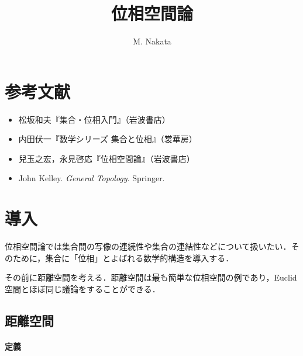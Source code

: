 \documentclass[pandoc,base=10pt,b5j,precisetext]{bxjsarticle}
\title{位相空間論}
\author{M. Nakata}
\date{}
\providecommand{\tightlist}{%
  \setlength{\itemsep}{0pt}\setlength{\parskip}{0pt}}
\let\oldparagraph\paragraph
\renewcommand{\paragraph}[1]{\oldparagraph{#1}\mbox{}}
\begin{document}
\maketitle

{
\setcounter{tocdepth}{3}
\tableofcontents
}
\newcommand{\deli}{\,:\,}
\newcommand{\bb}[1]{\boldsymbol{#1}}
\renewcommand{\i}{\mathrm{i}}
\renewcommand{\bar}[1]{\overline{#1}}
\renewcommand{\le}{\leqslant}
\renewcommand{\ge}{\geqslant}
\newcommand{\qset}[2]{{#1}/\!\,{#2}}
\newcommand{\scr}[1]{\mathscr{#1}}
\renewcommand{\cal}[1]{\mathcal{#1}}
\newcommand{\pfrac}[2]{\frac{\partial #1}{\partial #2}}
\newcommand{\card}{\mathop{\mathrm{card}}\nolimits}
\newcommand{\Span}{\mathop{\mathrm{span}}}
\newcommand{\obj}{\mathop{\mathrm{obj}}}
\newcommand{\Hom}{\mathop{\mathrm{Hom}}}

\hypertarget{ux53c2ux8003ux6587ux732e}{%
\section{参考文献}\label{ux53c2ux8003ux6587ux732e}}

\begin{itemize}
\tightlist
\item
  松坂和夫『集合・位相入門』（岩波書店）
\item
  内田伏一『数学シリーズ 集合と位相』（裳華房）
\item
  兒玉之宏，永見啓応『位相空間論』（岩波書店）
\item
  John Kelley. \emph{General Topology}. Springer.
\end{itemize}

\hypertarget{topology-introduction}{%
\section{導入}\label{topology-introduction}}

位相空間論では集合間の写像の連続性や集合の連結性などについて扱いたい．そのために，集合に「位相」とよばれる数学的構造を導入する．

その前に距離空間を考える．距離空間は最も簡単な位相空間の例であり，Euclid空間とほぼ同じ議論をすることができる．

\hypertarget{metric-space}{%
\subsection{距離空間}\label{metric-space}}

\hypertarget{metric-space-def}{%
\paragraph{定義}\label{metric-space-def}}
\end{document}
